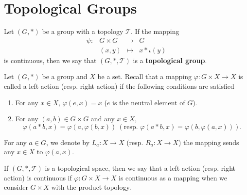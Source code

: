 \section{Topological Groups}

\begin{definitionenv}
    Let $(G,*)$ be a group with a topology $\mathscr{T}$.
    If the mapping
    $$\begin{array}{rrcl}
        \psi : & G\times G & \longrightarrow & G\\
        & (x,y) & \longmapsto & x*\iota(y)
    \end{array}$$
    is continuous, then we say that $(G,*,\mathscr{T})$ is a \textbf{topological group}.
\end{definitionenv}

\begin{definitionenv}
    Let $(G,*)$ be a group and $X$ be a set.
    Recall that a mapping $\varphi: G \times X \rightarrow X$ is called a left action (resp. right action) if the following conditions are satisfied
    \begin{enumerate}
        \item For any $x \in X$, $\varphi(e,x) = x$ ($e$ is the neutral element of $G$).
        \item For any $(a,b) \in G\times G$ and any $x \in X$,
            $$ \varphi(a*b, x) = \varphi(a,\varphi(b,x))\ (\text{resp. } \varphi(a*b, x) = \varphi(b,\varphi(a,x))).$$
    \end{enumerate}
    For any $a \in G$, we denote by $L_a : X \rightarrow X$ (resp. $R_a : X \rightarrow X$) the mapping sends any $x \in X$ to $\varphi(a,x)$.

    \quad If $(G,*,\mathscr{T})$ is a topological space, then we say that a left action (resp. right action) is continuous if $\varphi : G \times X \rightarrow X$ is continuous as a mapping when we consider $G \times X$ with the product topology.
\end{definitionenv}

